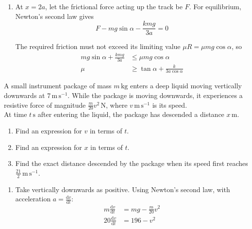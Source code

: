 \documentclass[leqno]{article}
\begin{document}
\begin{enumerate}[
  label=\textbf{\arabic*.},
  leftmargin=*,
  topsep=0pt,
  partopsep=0pt,
  parsep=0pt
]
\begin{djsSolution}
\begin{enumerate}[label=\textbf{(\alph*)}, start=1]
\item At \(x=2a\), let the frictional force acting up the track be \(F\). For equilibrium, Newton's second law gives
\[
F-mg\sin\alpha-\frac{kmg}{3a}=0
\]

The required friction must not exceed its limiting value \(\mu R=\mu mg\cos\alpha\), so
\begin{align*}
mg\sin\alpha+\frac{kmg}{3a}&\leq\mu mg\cos\alpha\\
\mu&\geq\tan\alpha+\frac{k}{3a\cos\alpha}
\end{align*}
\end{enumerate}
\end{djsSolution}

\newpage

\questionitem

A small instrument package of mass $m\,\mathrm{kg}$ enters a deep liquid moving vertically downwards at $7\,\mathrm{m\,s^{-1}}$. While the package is moving downwards, it experiences a resistive force of magnitude $\frac{m}{20}v^2\,\mathrm{N}$, where $v\,\mathrm{m\,s^{-1}}$ is its speed. \\

At time $t\,\mathrm{s}$ after entering the liquid, the package has descended a distance $x\,\mathrm{m}$. \\

\begin{enumerate}[label=\textbf{(\alph*)}]
  \item Find an expression for $v$ in terms of $t$.  \\
  \item Find an expression for $x$ in terms of $t$.  \\
  \item Find the exact distance descended by the package when its speed first reaches $\frac{21}{2}\,\mathrm{m\,s^{-1}}$.  \\
\end{enumerate}

\vspace*{10pt}

\begin{djsSolution}
\begin{enumerate}[label=\textbf{(\alph*)}, start=1]
\item Take vertically downwards as positive. Using Newton's second law, with acceleration \(a=\frac{\mathrm{d}v}{\mathrm{d}t}\):
\begin{align*}
m\frac{\mathrm{d}v}{\mathrm{d}t} &= mg-\frac{m}{20}v^2 \\
20\frac{\mathrm{d}v}{\mathrm{d}t} &= 196-v^2
\end{align*}


\end{enumerate}
\end{djsSolution}
\end{enumerate}
\end{document}
